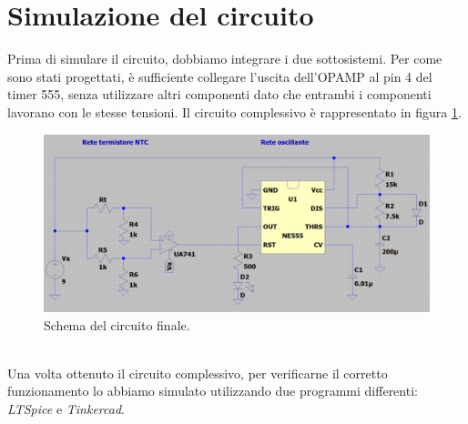\documentclass{report}
\begin{document}
\newpage
\section{Simulazione del circuito}
Prima di simulare il circuito, dobbiamo integrare i due sottosistemi. Per come sono stati progettati, è sufficiente collegare l'uscita dell'OPAMP al pin 4 del timer 555, senza utilizzare altri componenti dato che entrambi i componenti lavorano con le stesse tensioni. Il circuito complessivo è rappresentato in figura \ref{figura:schemaFinale}.
\begin{figure}[h!]
	\centering
	\includegraphics[width=\textwidth]{immagini/schemaFinale}
	\caption{Schema del circuito finale.} 
	\label{figura:schemaFinale}
\end{figure}
\\Una volta ottenuto il circuito complessivo, per verificarne il corretto funzionamento lo abbiamo simulato utilizzando due programmi differenti: \textit{LTSpice} e \textit{Tinkercad}.  
\end{document}

